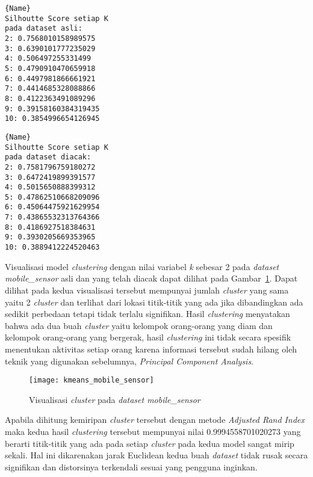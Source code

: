 \noindent\begin{minipage}{.48\textwidth}
\begin{lstlisting}[caption=\textit{Dataset mobile\_sensor} Asli,frame=tlrb, label=mobile_sensor_siluet_asli]{Name}
Silhoutte Score setiap K
pada dataset asli: 
2: 0.7568010158989575
3: 0.6390101777235029
4: 0.506497255331499
5: 0.4790910470659918
6: 0.4497981866661921
7: 0.4414685328088866
8: 0.4122363491089296
9: 0.39158160384319435
10: 0.3854996654126945
\end{lstlisting}
\end{minipage}\hfill
\begin{minipage}{.48\textwidth}
\begin{lstlisting}[caption=\textit{Dataset mobile\_sensor} Diacak,frame=tlrb, label=mobile_sensor_siluet_diacak]{Name}
Silhoutte Score setiap K
pada dataset diacak: 
2: 0.7581796759180272
3: 0.6472419899391577
4: 0.5015650888399312
5: 0.47862510668209096
6: 0.45064475921629954
7: 0.43865532313764366
8: 0.4186927518384631
9: 0.3930205669353965
10: 0.3889412224520463
\end{lstlisting}
\end{minipage}

Visualisasi model \textit{clustering} dengan nilai variabel \textit{k} sebesar 2 pada \textit{dataset} \textit{mobile\_sensor} asli dan yang telah diacak dapat dilihat pada Gambar~\ref{fig:kmeans_mobile_sensor}. Dapat dilihat pada kedua visualisasi tersebut mempunyai jumlah \textit{cluster} yang sama yaitu 2 \textit{cluster} dan terlihat dari lokasi titik-titik yang ada jika dibandingkan ada sedikit perbedaan tetapi tidak terlalu signifikan. Hasil \textit{clustering} menyatakan bahwa ada dua buah \textit{cluster} yaitu kelompok orang-orang yang diam dan kelompok orang-orang yang bergerak, hasil \textit{clustering} ini tidak secara spesifik menentukan aktivitas setiap orang karena informasi tersebut sudah hilang oleh teknik yang digunakan sebelumnya, \textit{Principal Component Analysis}. 
	
\begin{figure}
	\centering
	\texttt{[image: kmeans\_mobile\_sensor]}
	\caption{Visualisasi \textit{cluster} pada \textit{dataset mobile\_sensor}}
	\label{fig:kmeans_mobile_sensor}
\end{figure}
	
Apabila dihitung kemiripan \textit{cluster} tersebut dengan metode \textit{Adjusted Rand Index} maka kedua hasil \textit{clustering} tersebut mempunyai nilai 0.9994558701020273 yang berarti titik-titik yang ada pada setiap \textit{cluster} pada kedua model sangat mirip sekali. Hal ini dikarenakan jarak Euclidean kedua buah \textit{dataset} tidak rusak secara signifikan dan distorsinya terkendali sesuai yang pengguna inginkan.

